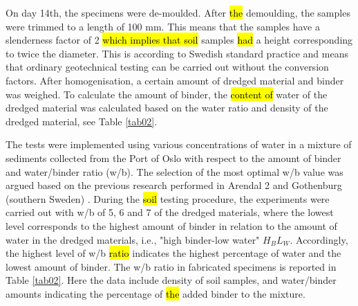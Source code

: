 \documentclass[sustainability,article,submit,pdftex,moreauthors]{Definitions/mdpi}
\begin{document}
On day 14th, the specimens were de-moulded. After \hl{the }demoulding, the samples were trimmed to a length of 100 mm. This means that the samples have a slenderness factor of 2 \hl{which implies that soil} samples \hl{had} a height corresponding to twice the diameter. This is according to Swedish standard practice and means that ordinary geotechnical testing can be carried out without the conversion factors. After homogenisation, a certain amount of dredged material and binder was weighed. To calculate the amount of binder, the \hl{content of }water of the dredged material was calculated based on the water ratio and density of the dredged material, see Table \ref{tab02}.

The tests were implemented using various concentrations of water in a mixture of sediments collected from the Port of Oslo with respect to the amount of binder and water/binder ratio (w/b). The selection of the most optimal w/b value was argued based on the previous research performed in Arendal 2 and Gothenburg (southern Sweden) \cite{Lemenkova202139}. During the \hl{soil }testing procedure, the experiments were carried out with w/b of 5, 6 and 7 of the dredged materials, where the lowest level corresponds to the highest amount of binder in relation to the amount of water in the dredged materials, i.e., "high binder-low water" $H_BL_W$. Accordingly, the highest level of w/b \hl{ratio }indicates the highest percentage of water and the lowest amount of binder. The w/b ratio in fabricated specimens is reported in Table \ref{tab02}. Here the data include density of soil samples, and water/binder amounts indicating the percentage of \hl{the }added binder to the mixture. 
\end{document}

